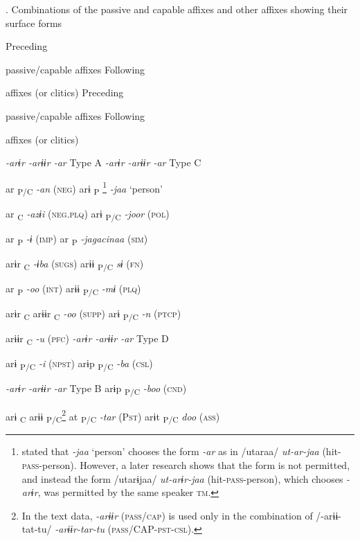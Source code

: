 \begin{table}
\caption{\label{tab:key:65}. Combinations of the passive and capable affixes and other affixes showing their surface forms}

Preceding

passive/capable affixes  Following

affixes (or clitics)    Preceding

passive/capable affixes  Following

affixes (or clitics)

\textit{-arɨr  -arɨɨr  -ar} Type A    \textit{-arɨr  -arɨɨr  -ar} Type C

    ar\textsubscript{ P/C}  \textit{-an} (\textsc{neg})    arɨ\textsubscript{ P}\textstyleFootnoteSymbol{} \footnote{\citet[70]{Niinaga2010} stated that \textit{-jaa} ‘person’ chooses the form \textit{-ar} as in /utaraa/ \textit{ut-ar-jaa} (hit-\textsc{pass}-person). However, a later research shows that the form is not permitted, and instead the form /utarɨjaa/ \textit{ut-arɨr-jaa} (hit-\textsc{pass}-person), which chooses \textit{-arɨr}, was permitted by the same speaker \textsc{tm}.}      \textit{-jaa} ‘person’

    ar\textsubscript{ C}  \textit{-azɨi} (\textsc{neg}.\textsc{plq})    arɨ\textsubscript{ P/C}      \textit{-joor} (\textsc{pol})

    ar \textsubscript{P}  \textit{-ɨ} (\textsc{imp})        ar\textsubscript{ P}  \textit{-jagacinaa} (\textsc{sim})

arɨr\textsubscript{ C}      \textit{-ɨba} (\textsc{sugs})      arɨɨ\textsubscript{ P/C}    \textit{sɨ}  (\textsc{fn})

    ar\textsubscript{ P}  \textit{-oo} (\textsc{int})      arɨɨ\textsubscript{ P/C}    \textit{-mɨ} (\textsc{plq})

arɨr\textsubscript{ C}  arɨɨr\textsubscript{ C}    \textit{-oo} (\textsc{supp})    arɨ\textsubscript{ P/C}      \textit{-n} (\textsc{ptcp})

  arɨɨr\textsubscript{ C}    \textit{-u} (\textsc{pfc})    \textit{-arɨr  -arɨɨr  -ar} Type D

arɨ\textsubscript{ P/C}      \textit{-i} (\textsc{npst})    arɨp\textsubscript{ P/C}      \textit{-ba} (\textsc{csl})

\textit{-arɨr  -arɨɨr  -ar} Type B    arɨp\textsubscript{ P/C}      \textit{-boo} (\textsc{cnd})

arɨ\textsubscript{ C}  arɨɨ\textsubscript{ P/C}\footnote{In the text data, \textit{-arɨɨr} (\textsc{pass}/\textsc{cap}) is used only in the combination of /-arɨɨ-tat-tu/ \textit{-arɨɨr-tar-tu} (\textsc{pass}/CAP-\textsc{pst}-\textsc{csl}).}  at\textsubscript{ P/C}  \textit{-tar} (P\textsc{st})    arɨt\textsubscript{ P/C}      \textit{doo}  (\textsc{ass})


\end{table}
